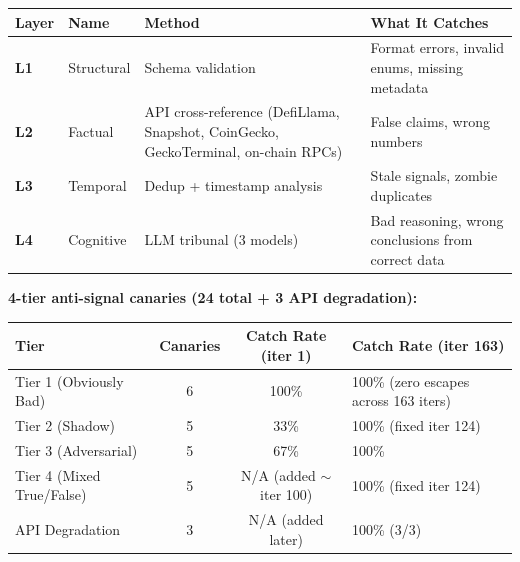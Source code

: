 \documentclass[11pt,a4paper]{article}
\newcounter{none} %
\begin{document}
{\def\LTcaptype{none} %
\begin{longtable}[]{@{}
  >{\raggedright\arraybackslash}p{}
  >{\raggedright\arraybackslash}p{}
  >{\raggedright\arraybackslash}p{}
  >{\raggedright\arraybackslash}p{}@{}}
\toprule\noalign{}
\begin{minipage}[b]{\linewidth}\raggedright
Layer
\end{minipage} & \begin{minipage}[b]{\linewidth}\raggedright
Name
\end{minipage} & \begin{minipage}[b]{\linewidth}\raggedright
Method
\end{minipage} & \begin{minipage}[b]{\linewidth}\raggedright
What It Catches
\end{minipage} \\
\midrule\noalign{}
\endhead
\bottomrule\noalign{}
\endlastfoot
\textbf{L1} & Structural & Schema validation & Format errors, invalid enums, missing metadata \\
\textbf{L2} & Factual & API cross-reference (DefiLlama, Snapshot, CoinGecko, GeckoTerminal, on-chain RPCs) & False claims, wrong numbers \\
\textbf{L3} & Temporal & Dedup + timestamp analysis & Stale signals, zombie duplicates \\
\textbf{L4} & Cognitive & LLM tribunal (3 models) & Bad reasoning, wrong conclusions from correct data \\
\end{longtable}
}

\textbf{4-tier anti-signal canaries (24 total + 3 API degradation):}

\begin{table}[ht]
\centering
\small
\renewcommand{\arraystretch}{1.3}
\begin{tabular*}{\textwidth}{@{\extracolsep{\fill}} l c c l @{}}
\toprule
\textbf{Tier} & \textbf{Canaries} & \textbf{Catch Rate (iter 1)} & \textbf{Catch Rate (iter 163)} \\
\midrule
Tier 1 (Obviously Bad)    & 6 & 100\%            & 100\% (zero escapes across 163 iters) \\
Tier 2 (Shadow)           & 5 & 33\%             & 100\% (fixed iter 124) \\
Tier 3 (Adversarial)      & 5 & 67\%             & 100\% \\
Tier 4 (Mixed True/False) & 5 & N/A (added $\sim$iter 100) & 100\% (fixed iter 124) \\
API Degradation           & 3 & N/A (added later) & 100\% (3/3) \\
\bottomrule
\end{tabular*}
\end{table}
\end{document}
